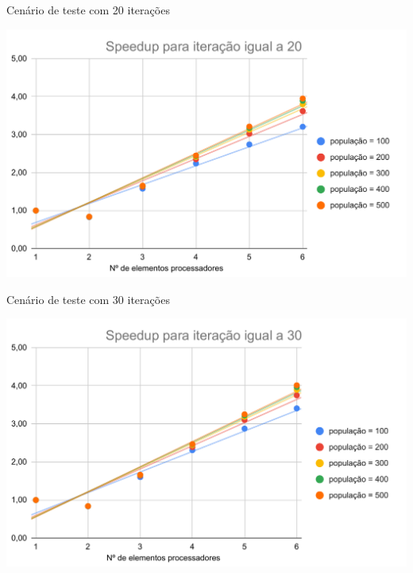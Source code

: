 
\begin{graph}[h]{16cm}
    \caption{Cenário de teste com 20 iterações}
    \label{cenario1a5}
        \includegraphics[width=14cm]{graficos/Speedup para iteração igual a 20.pdf}
\end{graph}

\begin{graph}[h]{16cm}
    \caption{Cenário de teste com 30 iterações}
    \label{cenario6a10}
        \includegraphics[width=14cm]{graficos/Speedup para iteração igual a 30.pdf}
\end{graph}

